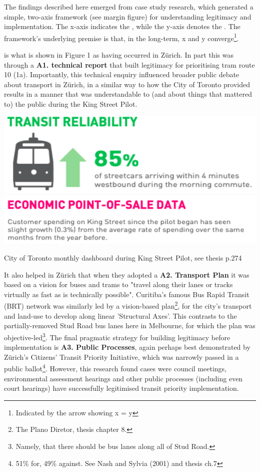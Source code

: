 \documentclass[nobib]{tufte-handout}
\begin{document}
The findings described here emerged from case study research, which generated a simple, two-axis framework (see margin figure) for understanding legitimacy and implementation. The x-axis indicates the , while the y-axis denotes the .  The framework's underlying premise is that, in the long-term,  x and y converge\footnote{Indicated by the arrow showing x = y}. 

 is what is shown in Figure 1 as having occurred in Zürich. In part this was through a \textbf{A1. technical report} that built legitimacy for prioritising tram route 10 (1a). Importantly, this technical enquiry influenced broader public debate about transport in Zürich, in a similar way to how the City of Toronto provided results in a manner that was understandable to (and about things that mattered to) the public during the King Street Pilot. 
\begin{marginfigure}%
  \includegraphics[width=\linewidth]{Toronto_dashboard_1}
   \includegraphics[width=\linewidth]{Toronto_dashboard_4}
  \caption{City of Toronto monthly dashboard during King Street Pilot, see thesis p.274}
  \label{fig:Toronto_dashboard}
\end{marginfigure}
It also helped in Zürich that when they adopted a \textbf{A2. Transport Plan} it was based on a vision for buses and trams to "travel along their lanes or tracks virtually as fast as is technically possible"\citep{Nash:2001ab}. Curitiba's famous Bus Rapid Transit (BRT) network was similarly led by a vision-based plan\footnote{The Plano Diretor, thesis chapter 8.}, for the city's transport and land-use to develop along linear 'Structural Axes'. This contrasts to the partially-removed Stud Road bus lanes here in Melbourne, for which the plan was objective-led\footnote{Namely, that there should be bus lanes along all of Stud Road.}.
The final pragmatic strategy for building legitimacy before implementation is \textbf{A3. Public Processes}, again perhaps best demonstrated by Zürich's Citizens' Transit Priority Initiative, which was narrowly passed in a public ballot\footnote{51\% for, 49\% against.  See Nash and Sylvia (2001) and thesis ch.7}. However, this research found cases were council meetings, environmental assessment hearings and other public processes (including even court hearings) have successfully legitimised transit priority implementation.  
\end{document}
